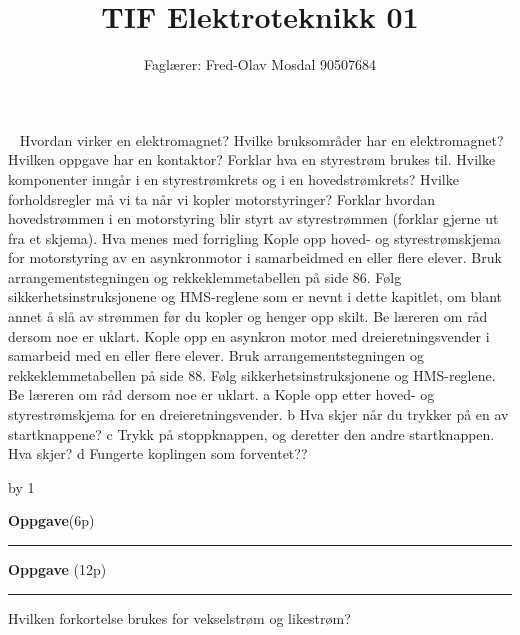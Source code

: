 \documentclass[12pt,a4paper]{article}
\def\oppgave{
            \advance\questnum by 1
	    \ifthenelse{\questnum>0\AND \questnum<9}
	    {
                \vskip 1cm
		\textbf{Oppgave}\hskip 5pt\the\questnum \hfill \hfill(6p)
		\vskip 3pt
		\hrule
	\vskip 0.5cm}
	{
                \vskip 1cm
		\textbf{Oppgave}\hskip 5pt \the\questnum \hfill \hfill(12p)
		\vskip 3pt \hrule \vskip 0.5cm }

		}
\begin{document}
\title{TIF Elektroteknikk 01}
\author{Faglærer: Fred-Olav Mosdal 90507684\\}
\maketitle
\newpage
\
\newpage
Hvordan virker en elektromagnet?
Hvilke bruksområder har en elektromagnet?
Hvilken oppgave har en kontaktor?
Forklar hva en styrestrøm brukes til.
Hvilke komponenter inngår i en styrestrømkrets og i en hovedstrømkrets?
Hvilke forholdsregler må vi ta når vi kopler motorstyringer?
Forklar hvordan hovedstrømmen i en motorstyring blir styrt av styrestrømmen (forklar gjerne ut fra et skjema).
Hva menes med forrigling
Kople opp hoved- og styrestrømskjema for motorstyring av en asynkronmotor i samarbeidmed en eller flere elever. Bruk arrangementstegningen og rekkeklemmetabellen på side 86.
Følg sikkerhetsinstruksjonene og HMS-reglene som er nevnt i dette kapitlet, om blant annet å slå av strømmen før du kopler og henger opp skilt. Be læreren om råd dersom noe er uklart.
Kople opp en asynkron motor med dreieretningsvender i samarbeid med en eller flere elever. Bruk arrangementstegningen og rekkeklemmetabellen på side 88. Følg sikkerhetsinstruksjonene og HMS-reglene. Be læreren om råd dersom noe er uklart.
a Kople opp etter hoved- og styrestrømskjema for en dreieretningsvender.
b Hva skjer når du trykker på en av startknappene?
c Trykk på stoppknappen, og deretter den andre startknappen. Hva skjer?
d Fungerte koplingen som forventet??
\oppgave{}%
\vskip 2.5pt 
Hvilken forkortelse brukes for vekselstrøm og likestrøm?
\vskip 5pt 
\vskip 2.5pt 
\newpage
\end{document}
